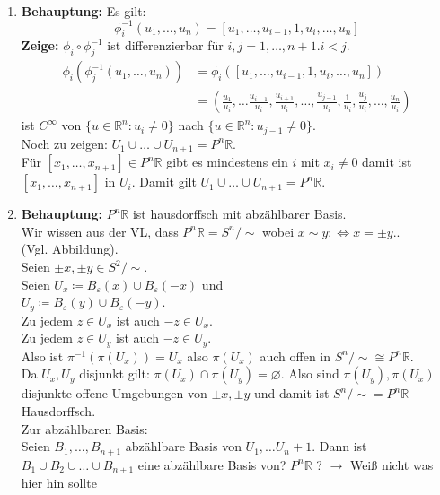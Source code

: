 \begin{solution}
  \
  \begin{enumerate}[label=(\alph*)]
    \item \textbf{Behauptung:} Es gilt:
    \begin{equation*}
      \phi_i^{-1} (u_1, \dots , u_{n}) = [u_1, \dots , u_{i-1}, 1, u_i, \dots , u_n]
    \end{equation*}
    \textbf{Zeige:} \( \phi_i \circ \phi^{-1}_j \) ist differenzierbar für \( i,j = 1, \dots, n+1. i < j \).
    \begin{align*}
      \phi_i (\phi_j^{-1} (u_1, \dots , u_{n})) &= \phi_i([u_1, \dots , u_{i-1}, 1, u_i, \dots , u_n]) \\
      &= \left( 
      \frac{u_1}{u_i}, \dots \frac{u_{i-1}}{u_i}, \frac{u_{i+1}}{u_i}, \dots , \frac{u_{j-1}}{u_i}, \frac{1}{u_i}, \frac{u_{j}}{u_i}, \dots, \frac{u_n}{u_i} 
      \right)
    \end{align*}
    ist \( C^{\infty} \) von \( \{ u \in \mathbb{R}^n : u_i \neq 0 \} \) nach \( \{ u \in \mathbb{R}^n : u_{j-1} \neq 0 \} \). \\
    Noch zu zeigen: \( U_1 \cup \dots \cup U_{n+1} = P^n\mathbb{R} \). \\
    Für \( [x_1, \dots , x_{n+1}] \in P^n\mathbb{R} \) gibt es mindestens ein \( i \) mit \( x_i \neq 0 \) damit ist \( [x_1, \dots , x_{n+1}] \) in \( U_i \). Damit gilt \( U_1 \cup \dots \cup U_{n+1} = P^n\mathbb{R} \).

    \item \textbf{Behauptung:} \( P^n\mathbb{R} \) ist hausdorffsch mit abzählbarer Basis. \\
    Wir wissen aus der VL, dass \( P^n\mathbb{R} = S^n / \sim \) wobei \( x \sim y :\Leftrightarrow x = \pm y. \). \\
    (Vgl. Abbildung). \\
    Seien \( \pm x, \pm y \in S^2 / \sim \). \\
    Seien \( U_x \coloneqq B_\varepsilon(x) \cup B_\varepsilon(-x) \) und \\
    \( U_y \coloneqq B_\varepsilon(y) \cup B_\varepsilon(-y) \). \\
    Zu jedem \( z \in U_x \) ist auch \( -z \in U_x \). \\
    Zu jedem \( z \in U_y \) ist auch \( -z \in U_y \). \\
    Also ist \( \pi^{-1} (\pi(U_x)) = U_x \) also \( \pi(U_x) \) auch offen in \( S^n / \sim \cong P^n\mathbb{R} \). \\
    Da \( U_x, U_y \) disjunkt gilt: \( \pi(U_x) \cap \pi(U_y) = \varnothing \). Also sind \( \pi(U_y), \pi(U_x) \) disjunkte offene Umgebungen von \( \pm x, \pm y \) und damit ist \( S^n / \sim = P^n\mathbb{R} \) Hausdorffsch. \\
    Zur abzählbaren Basis: \\
    Seien \( B_1, \dots, B_{n+1} \) abzählbare Basis von \( U_1, \dots U_n+1 \). Dann ist \( B_1 \cup B_2 \cup \dots \cup B_{n+1} \) eine abzählbare Basis von? \( P^n\mathbb{R} \) \quad? \( \to \) Weiß nicht was hier hin sollte %
  \end{enumerate}
\end{solution}



